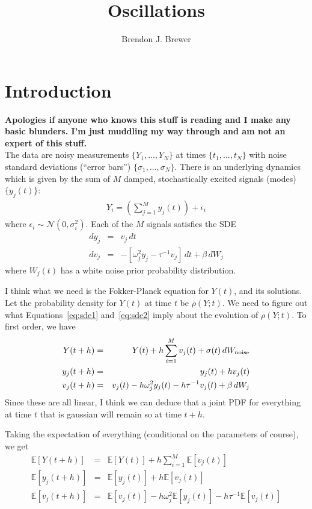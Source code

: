 \documentclass[letterpaper, 11pt]{article}
\title{Oscillations}
\author{Brendon J. Brewer}
\newcommand{\E}{\mathds{E}}
\begin{document}
\maketitle

\section{Introduction}
{\bf Apologies if anyone who knows this stuff is reading and I make any basic
blunders. I'm just muddling my way through and am not an expert of this stuff.}\\

The data are noisy measurements $\{Y_1, ..., Y_N\}$ at times
$\{t_1, ..., t_N\}$ with noise standard deviations (``error bars'')
$\{\sigma_1, ..., \sigma_N\}$. There is an underlying dynamics which is
given by the sum of $M$ damped, stochastically excited signals (modes)
$\{y_j(t)\}$:
\begin{eqnarray}
Y_i = \left(\sum_{j=1}^M y_j(t)\right) + \epsilon_i
\end{eqnarray}
where $\epsilon_i \sim \mathcal{N}(0, \sigma_i^2)$.
Each of the $M$ signals satisfies the SDE
\begin{eqnarray}
dy_j &=& v_j \,dt\label{eq:sde1}\\
dv_j &=& -\left[\omega_j^2y_j - \tau^{-1}v_j\right] \,dt + \beta \,dW_j\label{eq:sde2}
\end{eqnarray}
where $W_j(t)$ has a white noise prior probability distribution.

I think what we need is the Fokker-Planck equation for $Y(t)$, and its
solutions. Let the probability density for $Y(t)$ at time $t$ be
$\rho(Y; t)$. We need to figure out what Equations~\ref{eq:sde1}
and~\ref{eq:sde2} imply about the evolution of $\rho(Y; t)$.
To first order, we have
\begin{eqnarray}
Y(t+h) &=& Y(t) + h\sum_{i=1}^M v_j(t) + \sigma(t)\,dW_{\rm noise}\\
y_j(t + h) &=& y_j(t) + h v_j(t)\\
v_j(t + h) &=& v_j(t) - h\omega_j^2y_j(t) - h\tau^{-1}v_j(t) + \beta \,dW_j
\end{eqnarray}
Since these are all linear, I think we can deduce that a joint PDF for
everything at time $t$ that is gaussian will remain so at time $t+h$.

Taking the expectation of everything (conditional on the parameters of course),
we get
\begin{eqnarray}
\E\left[Y(t+h)\right] &=& \E\left[Y(t)\right] + h\sum_{i=1}^M \E\left[v_j(t)\right]\\
\E\left[y_j(t + h)\right] &=& \E\left[y_j(t)\right] + h\E\left[v_j(t)\right]\\
\E\left[v_j(t + h)\right] &=& \E\left[v_j(t)\right] - h\omega_j^2\E\left[y_j(t)\right] - h\tau^{-1}\E\left[v_j(t)\right]
\end{eqnarray}
\end{document}
